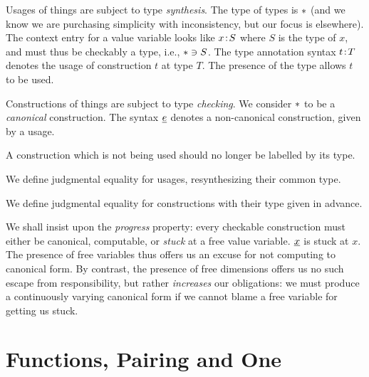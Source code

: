 \documentclass{article}
\begin{document}
Usages of things are subject to type \emph{synthesis}. The type of types is $\TY$ (and we
know we are purchasing simplicity with inconsistency, but our focus is elsewhere).
The context entry for a value variable looks like $x\!:\! S$ where $S$ is the type of $x$, and must thus be checkably a type, i.e., $\TY\ni S$.
The type annotation syntax $t\!:\! T$ denotes the usage of construction $t$ at type $T$.
The presence of the type allows $t$ to be used.

Constructions of things are subject to type \emph{checking}.
We consider $\TY$ to be a \emph{canonical} construction.
The syntax $\underline e$ denotes a non-canonical construction, given by a usage.

A construction which is not being used should no longer be labelled by its type.

We define judgmental equality for usages, resynthesizing their common type.

We define judgmental equality for constructions with their type given in advance.

We shall insist upon the \emph{progress} property: every checkable construction must
either be canonical, computable, or \emph{stuck} at a free value variable. $\underline x$ is stuck at $x$. The presence of free variables thus offers us an excuse for not computing to canonical form. By contrast, the presence of free dimensions offers us no such escape from responsibility, but rather \emph{increases} our obligations: we must produce a continuously varying canonical form if we cannot blame a free variable for getting us stuck.

\section{Functions, Pairing and One}
\end{document}
